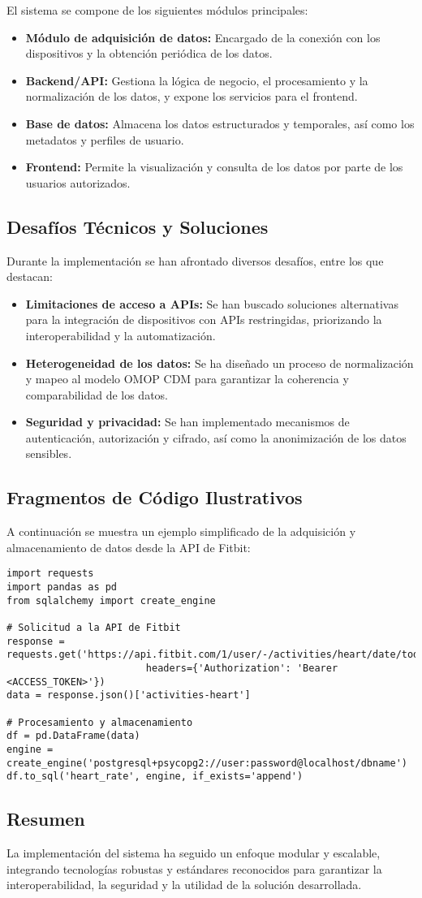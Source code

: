 El sistema se compone de los siguientes módulos principales:
\begin{itemize}
    \item \textbf{Módulo de adquisición de datos:} Encargado de la conexión con los dispositivos y la obtención periódica de los datos.
    \item \textbf{Backend/API:} Gestiona la lógica de negocio, el procesamiento y la normalización de los datos, y expone los servicios para el frontend.
    \item \textbf{Base de datos:} Almacena los datos estructurados y temporales, así como los metadatos y perfiles de usuario.
    \item \textbf{Frontend:} Permite la visualización y consulta de los datos por parte de los usuarios autorizados.
\end{itemize}

\subsection{Desafíos Técnicos y Soluciones}

Durante la implementación se han afrontado diversos desafíos, entre los que destacan:
\begin{itemize}
    \item \textbf{Limitaciones de acceso a APIs:} Se han buscado soluciones alternativas para la integración de dispositivos con APIs restringidas, priorizando la interoperabilidad y la automatización.
    \item \textbf{Heterogeneidad de los datos:} Se ha diseñado un proceso de normalización y mapeo al modelo OMOP CDM para garantizar la coherencia y comparabilidad de los datos.
    \item \textbf{Seguridad y privacidad:} Se han implementado mecanismos de autenticación, autorización y cifrado, así como la anonimización de los datos sensibles.
\end{itemize}

\subsection{Fragmentos de Código Ilustrativos}

A continuación se muestra un ejemplo simplificado de la adquisición y almacenamiento de datos desde la API de Fitbit:

\begin{verbatim}
import requests
import pandas as pd
from sqlalchemy import create_engine

# Solicitud a la API de Fitbit
response = requests.get('https://api.fitbit.com/1/user/-/activities/heart/date/today/1d.json',
                        headers={'Authorization': 'Bearer <ACCESS_TOKEN>'})
data = response.json()['activities-heart']

# Procesamiento y almacenamiento
df = pd.DataFrame(data)
engine = create_engine('postgresql+psycopg2://user:password@localhost/dbname')
df.to_sql('heart_rate', engine, if_exists='append')
\end{verbatim}

\subsection{Resumen}

La implementación del sistema ha seguido un enfoque modular y escalable, integrando tecnologías robustas y estándares reconocidos para garantizar la interoperabilidad, la seguridad y la utilidad de la solución desarrollada.
